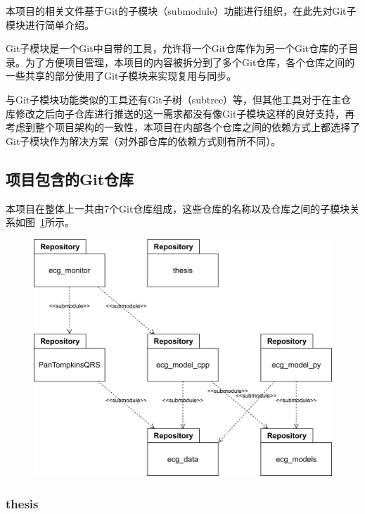 本项目的相关文件基于Git的子模块（submodule）功能进行组织，在此先对Git子模块进行简单介绍。

Git子模块是一个Git中自带的工具，允许将一个Git仓库作为另一个Git仓库的子目录。为了方便项目管理，本项目的内容被拆分到了多个Git仓库，各个仓库之间的一些共享的部分使用了Git子模块来实现复用与同步。

与Git子模块功能类似的工具还有Git子树（subtree）等，但其他工具对于在主仓库修改之后向子仓库进行推送的这一需求都没有像Git子模块这样的良好支持，再考虑到整个项目架构的一致性，本项目在内部各个仓库之间的依赖方式上都选择了Git子模块作为解决方案（对外部仓库的依赖方式则有所不同）。

\subsection{项目包含的Git仓库}\label{subsec:git-repositories}

本项目在整体上一共由7个Git仓库组成，这些仓库的名称以及仓库之间的子模块关系如图~\ref{fig:repositories}所示。

\begin{figure}[!ht]
    \includegraphics[width=\textwidth]{../assets/repositories.drawio}
    \label{fig:repositories}
\end{figure}

\subsubsection{thesis}\label{subsubsec:repo-thesis}

